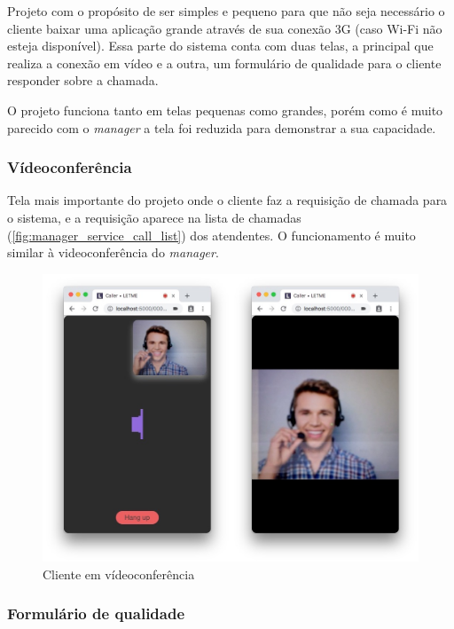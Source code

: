 Projeto com o propósito de ser simples e pequeno para que não seja necessário o cliente baixar uma aplicação grande através de sua conexão 3G (caso Wi-Fi não esteja disponível). Essa parte do sistema conta com duas telas, a principal que realiza a conexão em vídeo e a outra, um formulário de qualidade para o cliente responder sobre a chamada.

O projeto funciona tanto em telas pequenas como grandes, porém como é muito parecido com o \textit{manager} a tela foi reduzida para demonstrar a sua capacidade.

\subsubsection{Vídeoconferência}

Tela mais importante do projeto onde o cliente faz a requisição de chamada para o sistema, e a requisição aparece na lista de chamadas (\autoref{fig:manager_service_call_list}) dos atendentes. O funcionamento é muito similar à videoconferência do \textit{manager}.

\begin{figure}[ht!]
	\centering
    \includegraphics[scale=0.35]{figures/screens/caller-video-chat-overlay.jpg}
	\caption{Cliente em vídeoconferência}
	\label{fig:caller_video_chat_overlay}
\end{figure}

\subsubsection{Formulário de qualidade}


